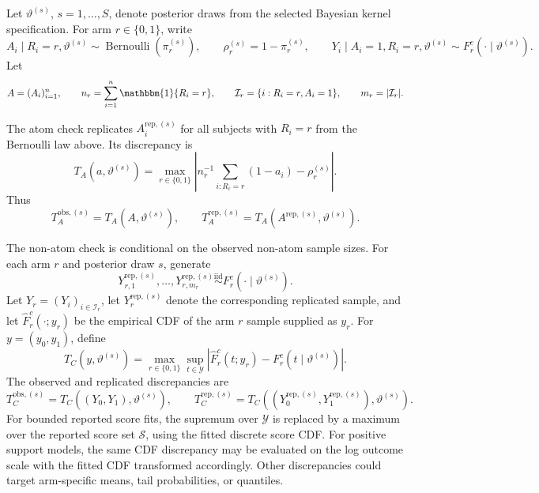 \documentclass[11pt]{article}
\DeclareMathOperator{\Bernoulli}{Bernoulli}
\begin{document}
Let \(\vartheta^{(s)}\), \(s=1,\ldots,S\), denote posterior draws from the
selected Bayesian kernel specification. For arm \(r\in\{0,1\}\), write
\[
  A_i\mid R_i=r,\vartheta^{(s)}
  \sim\Bernoulli\!\left(\pi_r^{(s)}\right),
  \qquad
  \rho_r^{(s)}=1-\pi_r^{(s)},
  \qquad
  Y_i\mid A_i=1,R_i=r,\vartheta^{(s)}
  \sim F_r^c(\cdot\mid\vartheta^{(s)}).
\]
Let
\[
  A=(A_i)_{i=1}^n,
  \qquad
  n_r=\sum_{i=1}^n\mathbbm{1}\{R_i=r\},
  \qquad
  \mathcal{I}_r=\{i:R_i=r,A_i=1\},
  \qquad
  m_r=|\mathcal{I}_r|.
\]

The atom check replicates \(A_i^{\mathrm{rep},(s)}\) for all subjects with
\(R_i=r\) from the Bernoulli law above. Its discrepancy is
\[
  T_A(a,\vartheta^{(s)})
  =
  \max_{r\in\{0,1\}}
  \left|
    n_r^{-1}\sum_{i:R_i=r}(1-a_i)-\rho_r^{(s)}
  \right|.
\]
Thus
\[
  T_A^{\mathrm{obs},(s)}=T_A(A,\vartheta^{(s)}),
  \qquad
  T_A^{\mathrm{rep},(s)}
  =
  T_A(A^{\mathrm{rep},(s)},\vartheta^{(s)}).
\]

The non-atom check is conditional on the observed non-atom sample sizes. For
each arm \(r\) and posterior draw \(s\), generate
\[
  Y_{r,1}^{\mathrm{rep},(s)},\ldots,Y_{r,m_r}^{\mathrm{rep},(s)}
  \stackrel{\mathrm{iid}}{\sim}
  F_r^c(\cdot\mid\vartheta^{(s)}).
\]
Let \(Y_r=(Y_i)_{i\in\mathcal{I}_r}\), let
\(Y_r^{\mathrm{rep},(s)}\) denote the corresponding replicated sample, and let
\(\widehat{F}_r^c(\cdot;y_r)\) be the empirical CDF of the arm \(r\) sample supplied as \(y_r\). For \(y=(y_0,y_1)\), define
\[
  T_C(y,\vartheta^{(s)})
  =
  \max_{r\in\{0,1\}}
  \sup_{t\in\mathcal{Y}}
  \left|
    \widehat{F}_r^c(t;y_r)-F_r^c(t\mid\vartheta^{(s)})
  \right|.
\]
The observed and replicated discrepancies are
\[
  T_C^{\mathrm{obs},(s)}
  =
  T_C((Y_0,Y_1),\vartheta^{(s)}),
  \qquad
  T_C^{\mathrm{rep},(s)}
  =
  T_C((Y_0^{\mathrm{rep},(s)},Y_1^{\mathrm{rep},(s)}),\vartheta^{(s)}).
\]
For bounded reported score fits, the supremum over \(\mathcal{Y}\) is replaced
by a maximum over the reported score set \(\mathcal{S}\), using the fitted
discrete score CDF\@. For positive support models, the same CDF discrepancy may
be evaluated on the log outcome scale with the fitted CDF transformed
accordingly. Other discrepancies could target arm-specific means, tail
probabilities, or quantiles.
\end{document}
